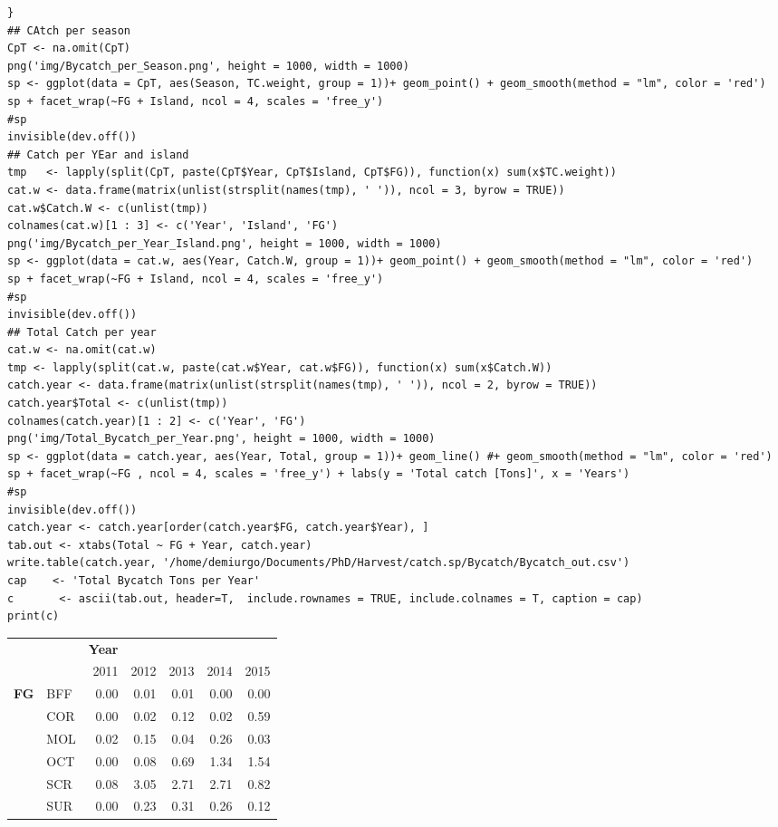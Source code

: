 \documentclass[11pt]{article}
\begin{document}
\begin{itemize}
\begin{itemize}
\begin{verbatim}
}
## CAtch per season
CpT <- na.omit(CpT)
png('img/Bycatch_per_Season.png', height = 1000, width = 1000)
sp <- ggplot(data = CpT, aes(Season, TC.weight, group = 1))+ geom_point() + geom_smooth(method = "lm", color = 'red')
sp + facet_wrap(~FG + Island, ncol = 4, scales = 'free_y')
#sp
invisible(dev.off())
## Catch per YEar and island
tmp   <- lapply(split(CpT, paste(CpT$Year, CpT$Island, CpT$FG)), function(x) sum(x$TC.weight))
cat.w <- data.frame(matrix(unlist(strsplit(names(tmp), ' ')), ncol = 3, byrow = TRUE))
cat.w$Catch.W <- c(unlist(tmp))
colnames(cat.w)[1 : 3] <- c('Year', 'Island', 'FG')
png('img/Bycatch_per_Year_Island.png', height = 1000, width = 1000)
sp <- ggplot(data = cat.w, aes(Year, Catch.W, group = 1))+ geom_point() + geom_smooth(method = "lm", color = 'red')
sp + facet_wrap(~FG + Island, ncol = 4, scales = 'free_y')
#sp
invisible(dev.off())
## Total Catch per year
cat.w <- na.omit(cat.w)
tmp <- lapply(split(cat.w, paste(cat.w$Year, cat.w$FG)), function(x) sum(x$Catch.W))
catch.year <- data.frame(matrix(unlist(strsplit(names(tmp), ' ')), ncol = 2, byrow = TRUE))
catch.year$Total <- c(unlist(tmp))
colnames(catch.year)[1 : 2] <- c('Year', 'FG')
png('img/Total_Bycatch_per_Year.png', height = 1000, width = 1000)
sp <- ggplot(data = catch.year, aes(Year, Total, group = 1))+ geom_line() #+ geom_smooth(method = "lm", color = 'red')
sp + facet_wrap(~FG , ncol = 4, scales = 'free_y') + labs(y = 'Total catch [Tons]', x = 'Years')
#sp
invisible(dev.off())
catch.year <- catch.year[order(catch.year$FG, catch.year$Year), ]
tab.out <- xtabs(Total ~ FG + Year, catch.year)
write.table(catch.year, '/home/demiurgo/Documents/PhD/Harvest/catch.sp/Bycatch/Bycatch_out.csv')
cap    <- 'Total Bycatch Tons per Year'
c       <- ascii(tab.out, header=T,  include.rownames = TRUE, include.colnames = T, caption = cap)
print(c)
\end{verbatim}

\begin{center}
\begin{tabular}{llrrrrr}
              &       &  \textbf{Year}  &        &        &        &        \\
              &       &           2011  &  2012  &  2013  &  2014  &  2015  \\
\hline
 \textbf{FG}  &  BFF  &           0.00  &  0.01  &  0.01  &  0.00  &  0.00  \\
              &  COR  &           0.00  &  0.02  &  0.12  &  0.02  &  0.59  \\
              &  MOL  &           0.02  &  0.15  &  0.04  &  0.26  &  0.03  \\
              &  OCT  &           0.00  &  0.08  &  0.69  &  1.34  &  1.54  \\
              &  SCR  &           0.08  &  3.05  &  2.71  &  2.71  &  0.82  \\
              &  SUR  &           0.00  &  0.23  &  0.31  &  0.26  &  0.12  \\
\end{tabular}
\end{center}




\end{itemize}
\end{itemize}
\end{document}
